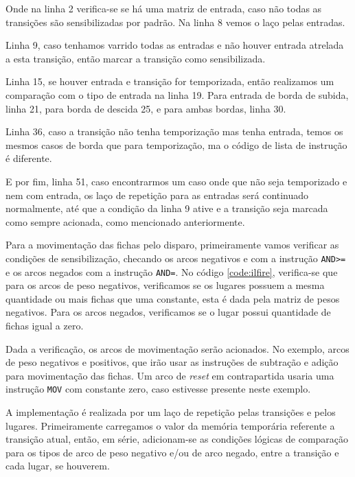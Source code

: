 

Onde na linha 2 verifica-se se há uma matriz de entrada, caso não todas as transições são sensibilizadas por padrão. Na linha 8 vemos o laço pelas entradas.

Linha 9, caso tenhamos varrido todas as entradas e não houver entrada atrelada a esta transição, então marcar a transição como sensibilizada. 

Linha 15, se houver entrada e transição for temporizada, então realizamos um comparação com o tipo de entrada na linha 19. Para entrada de borda de subida, linha 21, para borda de descida 25, e para ambas bordas, linha 30.

Linha 36, caso a transição não tenha temporização mas tenha entrada, temos os mesmos casos de borda que para temporização, ma o código de lista de instrução é diferente.

E por fim, linha 51, caso encontrarmos um caso onde que não seja temporizado e nem com entrada, os laço de repetição para as entradas será continuado normalmente, até que a condição da linha 9 ative e a transição seja marcada como sempre acionada, como mencionado anteriormente.

Para a movimentação das fichas pelo disparo, primeiramente vamos verificar as condições de sensibilização, checando os arcos negativos e com a instrução \lstinline{AND>=} e os arcos negados com a instrução \lstinline{AND=}. No código \ref{code:ilfire}, verifica-se que para os arcos de peso negativos, verificamos se os lugares possuem a mesma quantidade ou mais fichas que uma constante, esta é dada pela matriz de pesos negativos. Para os arcos negados, verificamos se o lugar possui quantidade de fichas igual a zero.



Dada a verificação, os arcos de movimentação serão acionados. No exemplo, arcos de peso negativos e positivos, que irão usar as instruções de subtração e adição para movimentação das fichas. Um arco de \textit{reset} em contrapartida usaria uma instrução \lstinline{MOV} com constante zero, caso estivesse presente neste exemplo.

A implementação é realizada por um laço de repetição pelas transições e pelos lugares. Primeiramente carregamos o valor da memória temporária referente a transição atual, então, em série, adicionam-se as condições lógicas de comparação para os tipos de arco de peso negativo e/ou de arco negado, entre a transição e cada lugar, se houverem.  

